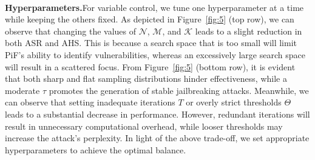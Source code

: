 \begin{figure*}[b]
\begin{center}
    \begin{subfigure}
    {
            \texttt{[image: image/Result\_1.pdf]}\hspace{-0.65em}
            \texttt{[image: image/Result\_2.pdf]}\hspace{-0.65em}
            \texttt{[image: image/Result\_3.pdf]}
    }
    \end{subfigure}
    \\        
    \vspace{-0.6em}
    \begin{subfigure}
    {
            \texttt{[image: image/Result\_5.pdf]}\hspace{-0.65em}
            \texttt{[image: image/Result\_4.pdf]}\hspace{-0.65em}
            \texttt{[image: image/Result\_6.pdf]}
    }
    \end{subfigure}
\vspace{-1.2em}
\caption{The impact of hyperparameters $\mathcal{N}$, $\mathcal{M}$, $\mathcal{K}$ (top row), and $\tau$, ${T}$, $\Theta$ (bottom row) on AdvBench.
}
\label{fig:5}
\end{center}
\end{figure*}

\textbf{Hyperparameters.}\hspace*{2mm}For variable control, we tune one hyperparameter at a time while keeping the others fixed.
As depicted in Figure~\ref{fig:5} (top row), we can observe that changing the values of $\mathcal{N}$, $\mathcal{M}$, and $\mathcal{K}$ leads to a slight reduction in both ASR and AHS.
This is because a search space that is too small will limit PiF's ability to identify vulnerabilities, whereas an excessively large search space will result in a scattered focus.
From Figure~\ref{fig:5} (bottom row), it is evident that both sharp and flat sampling distributions hinder effectiveness, while a moderate $\tau$ promotes the generation of stable jailbreaking attacks.
Meanwhile, we can observe that setting inadequate iterations $T$ or overly strict thresholds $\Theta$ leads to a substantial decrease in performance.
However, redundant iterations will result in unnecessary computational overhead, while looser thresholds may increase the attack's perplexity.
In light of the above trade-off, we set appropriate hyperparameters to achieve the optimal balance.

